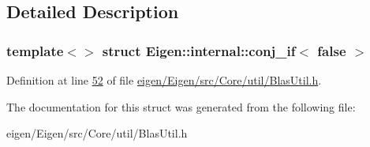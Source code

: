 \subsection{Detailed Description}
\subsubsection*{template$<$$>$\newline
struct Eigen\+::internal\+::conj\+\_\+if$<$ false $>$}



Definition at line \hyperlink{eigen_2_eigen_2src_2_core_2util_2_blas_util_8h_source_l00052}{52} of file \hyperlink{eigen_2_eigen_2src_2_core_2util_2_blas_util_8h_source}{eigen/\+Eigen/src/\+Core/util/\+Blas\+Util.\+h}.



The documentation for this struct was generated from the following file\+:\begin{DoxyCompactItemize}
\item 
eigen/\+Eigen/src/\+Core/util/\+Blas\+Util.\+h\end{DoxyCompactItemize}
